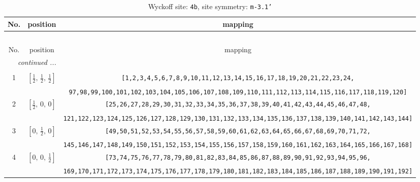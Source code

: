 \documentclass[fleqn,8pt]{jsarticle}
\begin{document}
\begin{longtable}{ccc}
\caption{Wyckoff site: {\tt 4b}, site symmetry: {\tt m-3.1'}}
 \\
 \hline \hline
No. & position & mapping \\ \hline \endfirsthead

\multicolumn{2}{l}{\tablename\ \thetable{}} \\
 \hline \hline
No. & position & mapping \\ \hline \endhead

 \hline \hline
\multicolumn{2}{r}{\footnotesize\it continued ...} \\ \endfoot

 \hline \hline
\multicolumn{2}{r}{} \\ \endlastfoot

1 & $\left[ \frac{1}{2},\, \frac{1}{2},\, \frac{1}{2} \right]$ & {\tt [1,2,3,4,5,6,7,8,9,10,11,12,13,14,15,16,17,18,19,20,21,22,23,24,} \\ \hline
 &  & {\tt 97,98,99,100,101,102,103,104,105,106,107,108,109,110,111,112,113,114,115,116,117,118,119,120]} \\ \hline
2 & $\left[ \frac{1}{2},\, 0,\, 0 \right]$ & {\tt [25,26,27,28,29,30,31,32,33,34,35,36,37,38,39,40,41,42,43,44,45,46,47,48,} \\ \hline
 &  & {\tt 121,122,123,124,125,126,127,128,129,130,131,132,133,134,135,136,137,138,139,140,141,142,143,144]} \\ \hline
3 & $\left[ 0,\, \frac{1}{2},\, 0 \right]$ & {\tt [49,50,51,52,53,54,55,56,57,58,59,60,61,62,63,64,65,66,67,68,69,70,71,72,} \\ \hline
 &  & {\tt 145,146,147,148,149,150,151,152,153,154,155,156,157,158,159,160,161,162,163,164,165,166,167,168]} \\ \hline
4 & $\left[ 0,\, 0,\, \frac{1}{2} \right]$ & {\tt [73,74,75,76,77,78,79,80,81,82,83,84,85,86,87,88,89,90,91,92,93,94,95,96,} \\ \hline
 &  & {\tt 169,170,171,172,173,174,175,176,177,178,179,180,181,182,183,184,185,186,187,188,189,190,191,192]} \\
\end{longtable}
\renewcommand{\arraystretch}{1.2}
\end{document}
